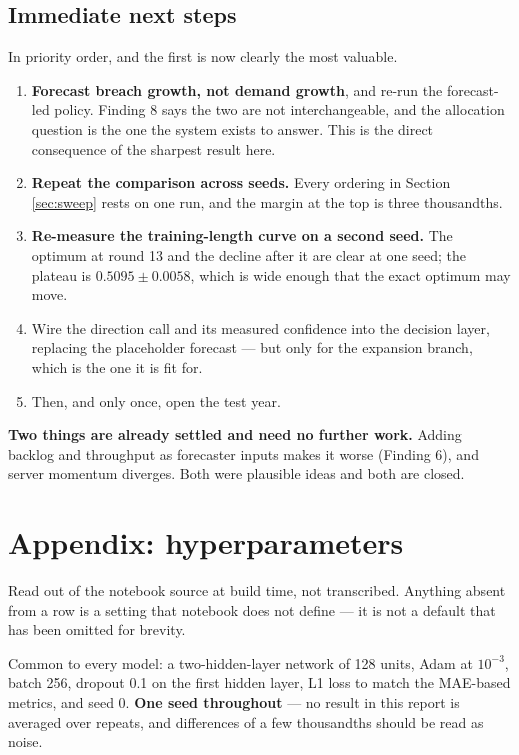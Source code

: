 \documentclass[11pt,a4paper]{article}
\begin{document}
\subsection{Immediate next steps}

In priority order, and the first is now clearly the most valuable.

\begin{enumerate}[leftmargin=1.5em]
\item \textbf{Forecast breach growth, not demand growth}, and re-run the forecast-led policy. Finding 8
says the two are not interchangeable, and the allocation question is the one the system exists to
answer. This is the direct consequence of the sharpest result here.
\item \textbf{Repeat the comparison across seeds.} Every ordering in Section \ref{sec:sweep} rests on one run, and
the margin at the top is three thousandths.
\item \textbf{Re-measure the training-length curve on a second seed.} The optimum at round 13 and
the decline after it are clear at one seed; the plateau is $0.5095 \pm 0.0058$, which is wide enough
that the exact optimum may move.
\item Wire the direction call and its measured confidence into the decision layer, replacing the
placeholder forecast --- but only for the expansion branch, which is the one it is fit for.
\item Then, and only once, open the test year.
\end{enumerate}

\textbf{Two things are already settled and need no further work.} Adding backlog and throughput as
forecaster inputs makes it worse (Finding 6), and server momentum diverges. Both were plausible ideas
and both are closed.

\appendix
\section{Appendix: hyperparameters}

Read out of the notebook source at build time, not transcribed. Anything absent from a row is a
setting that notebook does not define --- it is not a default that has been omitted for brevity.

Common to every model: a two-hidden-layer network of 128 units, Adam at $10^{-3}$, batch 256, dropout
0.1 on the first hidden layer, L1 loss to match the MAE-based metrics, and seed 0.
\textbf{One seed throughout} --- no result in this report is averaged over repeats, and differences of
a few thousandths should be read as noise.
\end{document}
